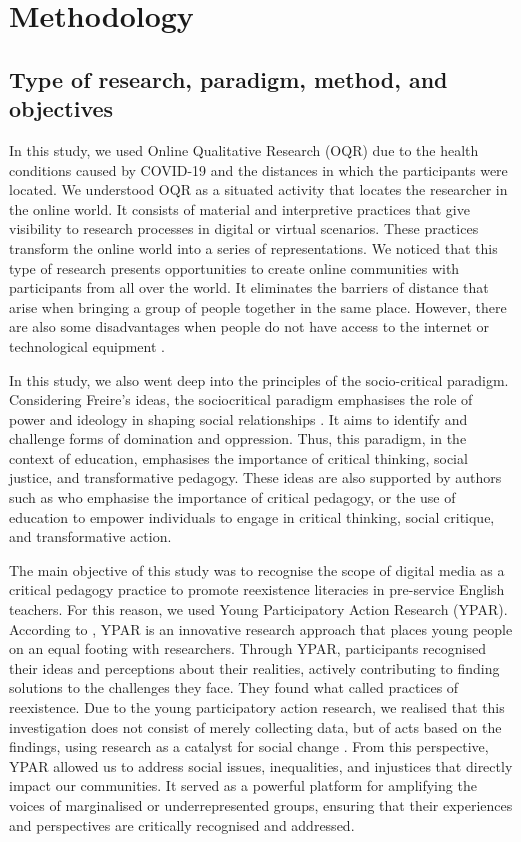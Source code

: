 \documentclass[english]{textolivre}
\begin{document}
\section{Methodology}\label{sec-formato}
\subsection{Type of research, paradigm, method, and objectives}
In this study, we used Online Qualitative Research (OQR) due to the health conditions caused by COVID-19 and the distances in which the participants were located. We understood OQR as a situated activity that locates the researcher in the online world. It consists of material and interpretive practices that give visibility to research processes in digital or virtual scenarios. These practices transform the online world into a series of representations. We noticed that this type of research presents opportunities to create online communities with participants from all over the world. It eliminates the barriers of distance that arise when bringing a group of people together in the same place. However, there are also some disadvantages when people do not have access to the internet or technological equipment \cite{denzin2005}.

In this study, we also went deep into the principles of the socio-critical paradigm. Considering Freire's ideas, the sociocritical paradigm emphasises the role of power and ideology in shaping social relationships \cite{freire1970}. It aims to identify and challenge forms of domination and oppression. Thus, this paradigm, in the context of education, emphasises the importance of critical thinking, social justice, and transformative pedagogy. These ideas are also supported by authors such as \textcite{fanon1963,freire1985,giroux2011,gramsci1999} who emphasise the importance of critical pedagogy, or the use of education to empower individuals to engage in critical thinking, social critique, and transformative action.

The main objective of this study was to recognise the scope of digital media as a critical pedagogy practice to promote reexistence literacies in pre-service English teachers. For this reason, we used Young Participatory Action Research (YPAR). According to \textcite{mirra2015doing}, YPAR is an innovative research approach that places young people on an equal footing with researchers. Through YPAR, participants recognised their ideas and perceptions about their realities, actively contributing to finding solutions to the challenges they face. They found what \textcite{alban2017,silva-souza2009letramentos,silva-souza2011letramentos} called practices of reexistence. Due to the young participatory action research, we realised that this investigation does not consist of merely collecting data, but of acts based on the findings, using research as a catalyst for social change \cite{cammarota2010}. From this perspective, YPAR allowed us to address social issues, inequalities, and injustices that directly impact our communities. It served as a powerful platform for amplifying the voices of marginalised or underrepresented groups, ensuring that their experiences and perspectives are critically recognised and addressed.
\end{document}
